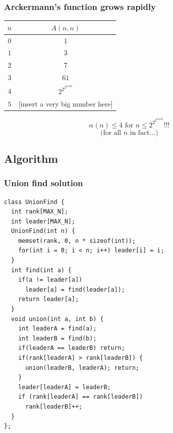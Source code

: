 \documentclass[10pt,svgnames,usenames,table]{beamer} %
\begin{document}
\begin{frame}
  \frametitle{Arckermann's function grows \textbf{rapidly}}
  \begin{center}
  \begin{tabular}{|c|c|}
  \hline
  $n$ & $A(n,n)$ \\
  \hline
  $0$ & $1$\\
  $1$ & $3$\\
  $2$ & $7$\\
  $3$ & $61$\\
  $4$ & {\Large $2^{2^{2^{65536}}}$}\\
  $5$ & [insert a very big number here]\\
  \hline
  \end{tabular}
  \end{center}
  {\Huge $$\alpha(n) \leq 4 \text{ for } n \leq 2^{2^{2^{65536}}} \text{!!!}$$}
  $$\text{(for all }n\text{ in fact...)}$$
\end{frame}
\subsection{Algorithm}
\begin{frame}[fragile]
  \frametitle{Union find solution}
  \begin{lstlisting}
class UnionFind {
  int rank[MAX_N];
  int leader[MAX_N];
  UnionFind(int n) {
    memset(rank, 0, n * sizeof(int));
    for(int i = 0; i < n; i++) leader[i] = i;
  }
  int find(int a) {
    if(a != leader[a])
      leader[a] = find(leader[a]);
    return leader[a];
  }
  void union(int a, int b) {
    int leaderA = find(a);
    int leaderB = find(b);
    if(leaderA == leaderB) return;
    if(rank[leaderA] > rank[leaderB]) {
      union(leaderB, leaderA); return;
    }
    leader[leaderA] = leaderB;
    if (rank[leaderA] == rank[leaderB])
      rank[leaderB]++;
  }
};
  \end{lstlisting}
\end{frame}
\end{document}
